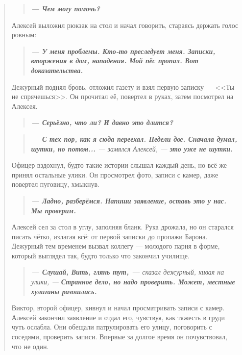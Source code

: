 \documentclass[12pt,a4paper]{book}
\newenvironment{dialogue}{\begin{quote}\itshape}{\end{quote}} %
\begin{document}
\begin{dialogue}
\begin{dialogue}
\textbf{--- Чем могу помочь?}
\end{dialogue}

Алексей выложил рюкзак на стол и начал говорить, стараясь держать голос ровным:

\begin{dialogue}
\textbf{--- У меня проблемы. Кто-то преследует меня. Записки, вторжения в дом, нападения. Мой пёс пропал. Вот доказательства.}
\end{dialogue}

Дежурный поднял бровь, отложил газету и взял первую записку --- <<Ты не спрячешься>>. Он прочитал её, повертел в руках, затем посмотрел на Алексея.

\begin{dialogue}
\textbf{--- Серьёзно, что ли? И давно это длится?}
\end{dialogue}

\begin{dialogue}
\textbf{--- С тех пор, как я сюда переехал. Недели две. Сначала думал, шутки, но потом...} --- замялся Алексей, --- \textbf{это уже не шутки.}
\end{dialogue}

Офицер вздохнул, будто такие истории слышал каждый день, но всё же принял остальные улики. Он просмотрел фото, записи с камер, даже повертел пуговицу, хмыкнув.

\begin{dialogue}
\textbf{--- Ладно, разберёмся. Напиши заявление, оставь это у нас. Мы проверим.}
\end{dialogue}

Алексей сел за стол в углу, заполняя бланк. Рука дрожала, но он старался писать чётко, излагая всё: от первой записки до пропажи Барона. Дежурный тем временем вызвал коллегу --- молодого парня в форме, который выглядел так, будто только что закончил училище.

\begin{dialogue}
\textbf{--- Слушай, Вить, глянь тут, ---} сказал дежурный, кивая на улики, --- \textbf{Странное дело, но надо проверить. Может, местные хулиганы разошлись.}
\end{dialogue}

Виктор, второй офицер, кивнул и начал просматривать записи с камер. Алексей закончил заявление и отдал его, чувствуя, как тяжесть в груди чуть ослабла. Они обещали патрулировать его улицу, поговорить с соседями, проверить записи. Впервые за долгое время он почувствовал, что не один.


\end{dialogue}
\end{document}
